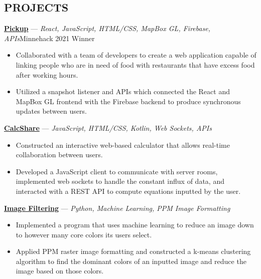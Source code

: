 \documentclass[11pt]{res}
\begin{document}
\begin{footnotesize}
\begin{resume}
\begin{small}
\section{PROJECTS}
\end{small} 
\vspace{.5mm}
\href{https://devpost.com/software/pickup-7b8yhx}{\textbf{Pickup}} — {\sl React, JavaScript, HTML/CSS, MapBox GL, Firebase, APIs}\hfill Minnehack 2021 Winner\vspace{-5mm}
\begin{itemize}[leftmargin=6.25mm] \itemsep -2pt 
\item Collaborated with a team of developers to create a web application capable of linking people who are in need of food with restaurants that have excess food after working hours.
\vspace{1.30mm}
\item Utilized a snapshot listener and APIs which connected the React and MapBox GL frontend with the Firebase backend to produce synchronous updates between users. 
\end{itemize}
\vspace{-2.5mm}
\href{https://github.com/CharlesShi12/CalcShare}{\textbf{CalcShare}} — {\sl JavaScript, HTML/CSS, Kotlin, Web Sockets, APIs} \vspace{-5mm}
\begin{itemize}[leftmargin=6.25mm] \itemsep -2pt 
\item Constructed an interactive web-based calculator that allows real-time collaboration between users. 
\vspace{1.30mm}
\item Developed a JavaScript client to communicate with server rooms, implemented web sockets to handle the constant influx of data, and interacted with a REST API to compute equations inputted by the user. 
\end{itemize}
\vspace{-2.5mm}
\href{https://github.com/CharlesShi12/ImageFilters}{\textbf{Image Filtering}} — {\sl Python, Machine Learning, PPM Image Formatting} \vspace{-5mm}
\begin{itemize}[leftmargin=6.25mm] \itemsep -2pt 
\item Implemented a program that uses machine learning to reduce an image down to however many core colors its users select.
\vspace{1.30mm}
\item Applied PPM raster image formatting and constructed a k-means clustering algorithm to find the dominant colors of an inputted image and reduce the image based on those colors. 
\end{itemize}
\begin{small}

\end{small}
\end{resume}
\end{footnotesize}
\end{document}
